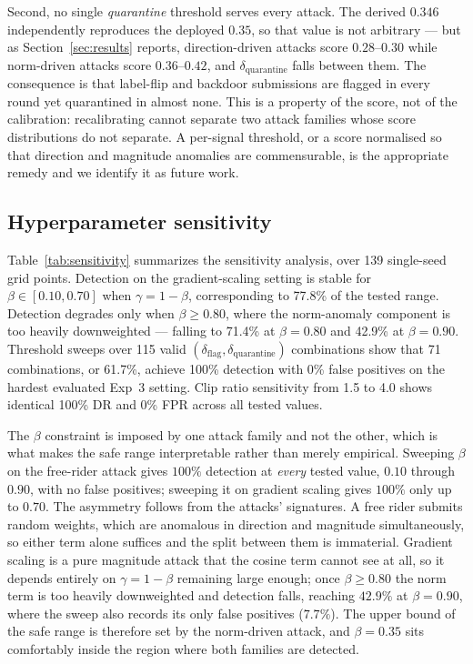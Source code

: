 \documentclass[pdflatex,sn-mathphys-num]{sn-jnl}
\begin{document}
Second, no single \emph{quarantine} threshold serves every attack. The derived $0.346$ independently reproduces the deployed $0.35$, so that value is not arbitrary --- but as Section~\ref{sec:results} reports, direction-driven attacks score $0.28$--$0.30$ while norm-driven attacks score $0.36$--$0.42$, and $\delta_{\mathrm{quarantine}}$ falls between them. The consequence is that label-flip and backdoor submissions are flagged in every round yet quarantined in almost none. This is a property of the score, not of the calibration: recalibrating cannot separate two attack families whose score distributions do not separate. A per-signal threshold, or a score normalised so that direction and magnitude anomalies are commensurable, is the appropriate remedy and we identify it as future work.

\subsection{Hyperparameter sensitivity}

Table~\ref{tab:sensitivity} summarizes the sensitivity analysis, over 139 single-seed grid points. Detection on the gradient-scaling setting is stable for $\beta\in[0.10,0.70]$ when $\gamma=1-\beta$, corresponding to 77.8\% of the tested range. Detection degrades only when $\beta\geq0.80$, where the norm-anomaly component is too heavily downweighted --- falling to 71.4\% at $\beta=0.80$ and 42.9\% at $\beta=0.90$. Threshold sweeps over 115 valid $(\delta_{\mathrm{flag}},\delta_{\mathrm{quarantine}})$ combinations show that 71 combinations, or 61.7\%, achieve 100\% detection with 0\% false positives on the hardest evaluated Exp~3 setting. Clip ratio sensitivity from 1.5 to 4.0 shows identical 100\% DR and 0\% FPR across all tested values.

The $\beta$ constraint is imposed by one attack family and not the other, which is what makes the safe range interpretable rather than merely empirical. Sweeping $\beta$ on the free-rider attack gives $100\%$ detection at \emph{every} tested value, $0.10$ through $0.90$, with no false positives; sweeping it on gradient scaling gives $100\%$ only up to $0.70$. The asymmetry follows from the attacks' signatures. A free rider submits random weights, which are anomalous in direction and magnitude simultaneously, so either term alone suffices and the split between them is immaterial. Gradient scaling is a pure magnitude attack that the cosine term cannot see at all, so it depends entirely on $\gamma=1-\beta$ remaining large enough; once $\beta\geq0.80$ the norm term is too heavily downweighted and detection falls, reaching $42.9\%$ at $\beta=0.90$, where the sweep also records its only false positives ($7.7\%$). The upper bound of the safe range is therefore set by the norm-driven attack, and $\beta=0.35$ sits comfortably inside the region where both families are detected.
\end{document}
